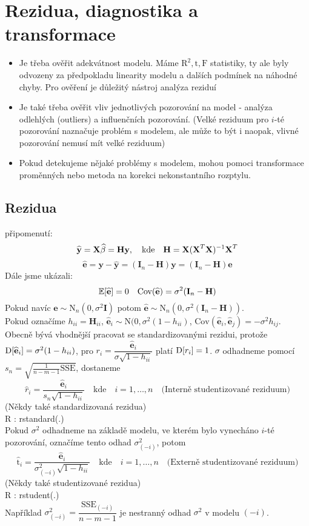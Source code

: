 \section{Rezidua, diagnostika a transformace}
\begin{itemize}
 \item Je třeba ověřit adekvátnost modelu. Máme $ \text{R}^{2} , \text{t}, \text{F} $ statistiky, ty ale byly odvozeny za předpokladu linearity modelu a dalších podmínek na náhodné chyby. Pro ověření je důležitý nástroj analýza reziduí
 \item Je také třeba ověřit vliv jednotlivých pozorování na model - analýza odlehlých (outliers) a influenčních pozorování. (Velké reziduum pro $ i $-té pozorování naznačuje problém s modelem, ale může to být i naopak, vlivné pozorování nemusí mít velké reziduum)
 \item Pokud detekujeme nějaké problémy s modelem, mohou pomoci transformace proměnných nebo metoda na korekci nekonstantního rozptylu.
\end{itemize}
\subsection{Rezidua}
připomenutí:
$$
 \widehat{\textbf{y}} = \textbf{X} \widehat{\beta} = \textbf{Hy} , \quad \text{kde} \quad \textbf{H} = \textbf{X} ( \textbf{X} ^{T} \textbf{X} )^{-1} \textbf{X} ^{T}
$$
$$
 \widehat{\textbf{e}} = \textbf{y} - \widehat{\textbf{y}} = ( \textbf{I}_n - \textbf{H} ) \textbf{y} =  ( \textbf{I}_n - \textbf{H} ) \textbf{e}
$$
Dále jsme ukázali:
$$
\mathbb{E} [ \widehat{\textbf{e}} ] = 0 \quad \text{Cov}(  \widehat{\textbf{e}} ) = \sigma^{2} ( \textbf{I}_n - \textbf{H} )
$$
Pokud navíc 
$
\textbf{e} \sim \text{N}_n ( 0 ,\sigma^{2} \textbf{I} ) $ potom $ \widehat{\textbf{e}} \sim \text{N}_n ( 0 ,\sigma^{2} ( \textbf{I}_n - \textbf{H})) 
$. \\ Pokud označíme $ h_{ii} = \textbf{H}_{ii} $, $ \widehat{\textbf{e}}_i \sim \text{N} ( 0 , \sigma^2 (1 - h_{ii} ) $, $ \text{Cov}( \widehat{\textbf{e}}_i , \widehat{\textbf{e}}_j  ) = -\sigma^2 h_{ij} $. \\
Obecně bývá vhodnější pracovat se standardizovanými rezidui, protože $ \mathrm{D} [  \widehat{\textbf{e}}_i ] = \sigma^2 (1 - h_{ii} ) $, pro $ r_i = \dfrac{\widehat{\textbf{e}}_i}{\sigma \sqrt{1-h_{ii}}} $ platí $ \mathrm{D} [ r_i ] = 1 $.
$ \sigma $ odhadneme pomocí $ s_n =  \sqrt{\frac{1}{n-m-1} \text{SSE}}$, dostaneme
$$
  \widehat{r}_i = \frac{\widehat{\textbf{e}}_i}{s_n \sqrt{1 - h_{ii}}} \quad \text{kde} \quad i = 1, \dots , n \quad \text{(Interně studentizované reziduum)}
$$
(Někdy také standardizovaná rezidua) \\
R : rstandard(.) \\
Pokud $ \sigma^2 $ odhadneme na základě modelu, ve kterém bylo vynecháno $ i $-té pozorování, označíme tento odhad $ \sigma^2_{(-i)} $, potom
$$
 \widehat{\text{t}}_i = \frac{\widehat{\textbf{e}}_i}{  \sigma^2_{(-i)} \sqrt{1 - h_{ii}}} \quad \text{kde} \quad i = 1, \dots , n \quad \text{(Externě studentizované reziduum)} 
$$
(Někdy také studentizované rezidua) \\
R : rstudent(.) \\
Například $ \sigma^2_{(-i)} = \dfrac{\text{SSE}_{(-i)}}{n-m-1} $ je nestranný odhad $ \sigma^2 $ v modelu $ (-i) $.

